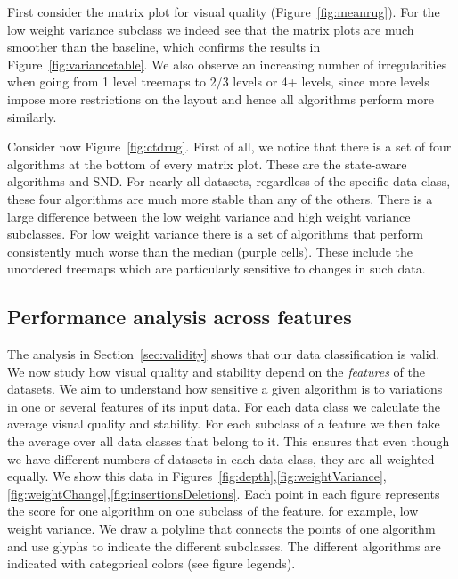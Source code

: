 
First consider the matrix plot for visual quality (Figure~\ref{fig:meanrug}). For the low weight variance subclass we indeed see that the matrix plots are much smoother than the baseline, which confirms the results in Figure~\ref{fig:variancetable}. 
%
We also observe an increasing number of irregularities when going from 1 level treemaps to 2/3 levels or 4+ levels, since more levels impose more restrictions on the layout and hence all algorithms perform more similarly. 

Consider now Figure~\ref{fig:ctdrug}. First of all, we notice that there is a set of four algorithms at the bottom of every matrix plot. These are the state-aware algorithms and SND. For nearly all datasets, regardless of the specific data class, these four algorithms are much more stable than any of the others. 
%
There is a large difference between the low weight variance and high weight variance subclasses. For low weight variance there is a set of algorithms that perform consistently much worse than the median (purple cells). These include the unordered treemaps which are particularly sensitive to changes in such data.


\subsection{Performance analysis across features}
\label{sec:acrossfeatures}
%
%
The analysis in Section~\ref{sec:validity} shows that our data classification is valid. We now study how visual quality and stability depend on the \emph{features} of the datasets. 
We aim to understand how sensitive a given algorithm is to variations in one or several features of its input data.
%
For each data class we calculate the average visual quality and stability. For each subclass of a feature we then take the average over all data classes that belong to it. This ensures that even though we have different numbers of datasets in each data class, they are all weighted equally. We show this data in Figures~\ref{fig:depth},\ref{fig:weightVariance},\ref{fig:weightChange},\ref{fig:insertionsDeletions}. Each point in each figure represents the score for one algorithm on one subclass of the feature, for example, low weight variance. We draw a polyline that connects the points of one algorithm and use glyphs to indicate the different subclasses. The different algorithms are indicated with categorical colors (see figure legends).



